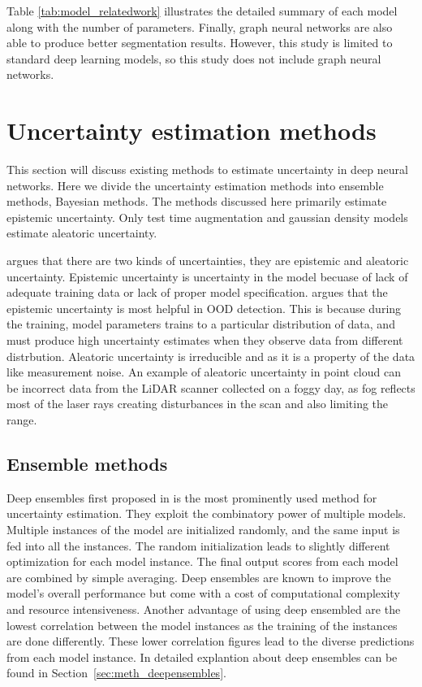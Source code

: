 Table \ref{tab:model_relatedwork} illustrates the detailed summary of each model along with the number of parameters.
Finally, graph neural networks \cite{dyn_graph_cnn} are also able to produce better segmentation results. However, this study is limited to standard deep learning models, so this study does not include graph neural networks.

    \section{Uncertainty estimation methods}
    This section will discuss existing methods to estimate uncertainty in deep neural networks.
    Here we divide the uncertainty estimation methods into ensemble methods, Bayesian methods.
    The methods discussed here primarily estimate epistemic uncertainty. Only test time augmentation and gaussian density models estimate aleatoric uncertainty.

    \cite{matias_uncertainty} argues that there are two kinds of uncertainties, they are epistemic and aleatoric uncertainty.
    Epistemic uncertainty is uncertainty in the model becuase of lack of adequate training data or lack of proper model specification.
    \cite{matias_uncertainty} argues that the epistemic uncertainty is most helpful in OOD detection.
    This is because during the training, model parameters trains to a particular distribution of data, and must produce high uncertainty estimates when they observe data from different distrbution.
    Aleatoric uncertainty is irreducible and as it is a property of the data like measurement noise.
    An example of aleatoric uncertainty in point cloud can be incorrect data from the LiDAR scanner collected on a foggy day, as fog reflects most of the laser rays creating disturbances in the scan and also limiting the range.
    \subsection{Ensemble methods}
    Deep ensembles first proposed in  \cite{lakshminarayanan2016simple} is the most prominently used method for uncertainty estimation.
    They exploit the combinatory power of multiple models.
    Multiple instances of the model are initialized randomly, and the same input is fed into all the instances.
    The random initialization leads to slightly different optimization for each model instance. The final output scores from each model are combined by simple averaging.
    Deep ensembles are known to improve the model's overall performance but come with a cost of computational complexity and resource intensiveness.
    Another advantage of using deep ensembled are the lowest correlation between the model instances as the training of the instances are done differently.
    These lower correlation figures lead to the diverse predictions from each model instance.
    In detailed explantion about deep ensembles can be found in Section~\ref{sec:meth_deepensembles}.

